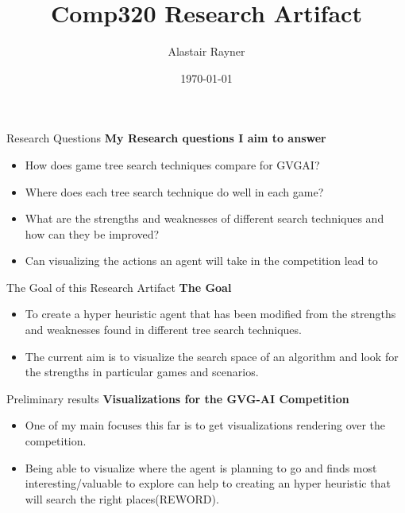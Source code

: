 \documentclass{beamer}
\title{Comp320 Research Artifact}
\author{Alastair Rayner}
\date{\today}
\begin{document}
\maketitle


\begin{frame}{Research Questions}
	\textbf{My Research questions I aim to answer}
	
	\begin{itemize}
    		\item How does game tree search techniques compare for GVGAI? \pause
    		\item Where does each tree search technique do well in each game? \pause 
    		\item What are the strengths and weaknesses of different search techniques and how can they be improved? \pause
	\end{itemize}
	
	\begin{itemize}
		\item Can visualizing the actions an agent will take in the competition lead to  \pause
	\end{itemize}
\end{frame}






\begin{frame}{The Goal of this Research Artifact}
		\textbf{The Goal} \pause
		\begin{itemize}
			\item To create a hyper heuristic agent that has been modified from the strengths and weaknesses found in different tree search techniques. \pause
			\item The current aim is to visualize the search space of an algorithm and look for the strengths in particular games and scenarios. \pause
		\end{itemize}
\end{frame}


\begin{frame}{Preliminary results}
\textbf{Visualizations for the GVG-AI Competition} \pause
		\begin{itemize}
			\item One of my main focuses this far is to get visualizations rendering over the competition. \pause
			\item Being able to visualize where the agent is planning to go and finds most interesting/valuable to explore can help to creating an hyper heuristic that will search the right places(REWORD).
		\end{itemize}
\end{frame}
\end{document}
